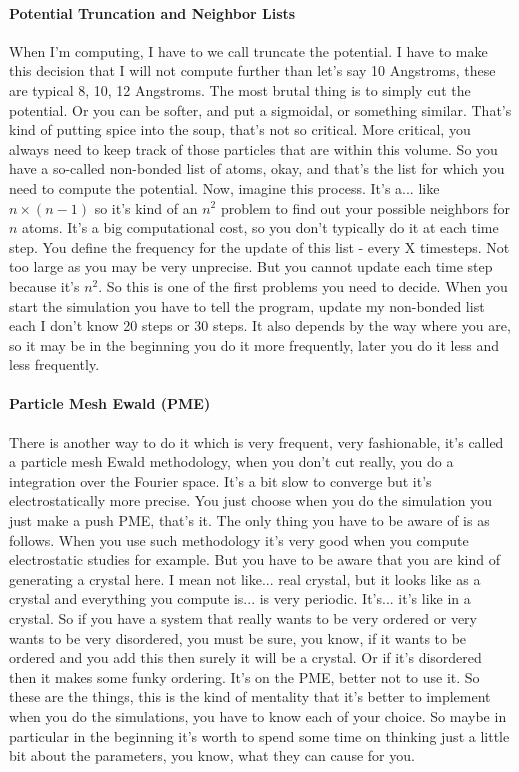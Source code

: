 \paragraph{Potential Truncation and Neighbor Lists}
When I'm computing, I have to we call truncate the potential. I have to make this decision that I will not compute further than let's say 10 Angstroms, these are typical 8, 10, 12 Angstroms. The most brutal thing is to simply cut the potential. Or you can be softer, and put a sigmoidal, or something similar. That's kind of putting spice into the soup, that's not so critical.
More critical, you always need to keep track of those particles that are within this volume. So you have a so-called non-bonded list of atoms, okay, and that's the list for which you need to compute the potential. Now, imagine this process. It's a... like $n \times (n - 1)$ so it’s kind of an $n^2$ problem to find out your possible neighbors for $n$ atoms. It's a big computational cost, so you don't typically do it at each time step. You define the frequency for the update of this list - every X timesteps. Not too large as you may be very unprecise. But you cannot update each time step because it's $n^2$. So this is one of the first problems you need to decide. When you start the simulation you have to tell the program, update my non-bonded list each I don't know 20 steps or 30 steps. It also depends by the way where you are, so it may be in the beginning you do it more frequently, later you do it less and less frequently.

\paragraph{Particle Mesh Ewald (PME)}
There is another way to do it which is very frequent, very fashionable, it's called a particle mesh Ewald methodology, when you don't cut really, you do a integration over the Fourier space. It's a bit slow to converge but it's electrostatically more precise. You just choose when you do the simulation you just make a push PME, that's it.
 The only thing you have to be aware of is as follows. When you use such methodology it's very good when you compute electrostatic studies for example. But you have to be aware that you are kind of generating a crystal here. I mean not like... real crystal, but it looks like as a crystal and everything you compute is... is very periodic. It's... it’s like in a crystal. So if you have a system that really wants to be very ordered or very wants to be very disordered, you must be sure, you know, if it wants to be ordered and you add this then surely it will be a crystal. Or if it’s disordered then it makes some funky ordering. It’s on the PME, better not to use it. So these are the things, this is the kind of mentality that it’s better to implement when you do the simulations, you have to know each of your choice. So maybe in particular in the beginning it's worth to spend some time on thinking just a little bit about the parameters, you know, what they can cause for you.


